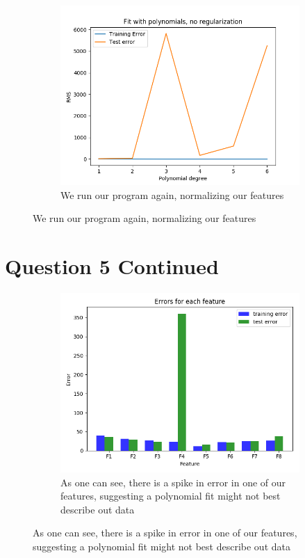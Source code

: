 \documentclass{article}
\begin{document}
\begin{enumerate}
	\begin{figure}[h!]
		\centering
		\begin{subfigure}[b]{0.4\linewidth}
			\includegraphics[width=\linewidth]{Error_vs_PolyDegreenorm.png}
			\caption{We run our program again, normalizing our features}
		\end{subfigure}
	\end{figure}

\end{enumerate}

\pagebreak

\section{Question 5 Continued}\label{sec:Question5Continued}
\begin{enumerate}
	\begin{figure}[h!]
		\centering
		\begin{subfigure}[b]{0.4\linewidth}
			\includegraphics[width=\linewidth]{Bargraph.png}
			\caption{As one can see, there is a spike in error in one of our features, suggesting a polynomial fit might not best describe out data}
		\end{subfigure}
	\end{figure}
\end{enumerate}
 
\end{document}

